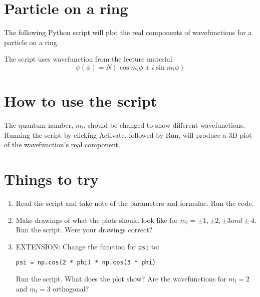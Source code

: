 \documentclass{article}
\begin{document}
\section{Particle on a ring}

The following Python script will plot the real components of wavefunctions for a particle on a ring. \par\medskip 
\noindent The script uses wavefunction from the lecture material:
\[\psi (\phi) = N(\cos m_l \phi \pm i \sin m_l \phi) \]

\section{How to use the script}
The quantum number, $m_l$, should be changed to show different wavefunctions. Running the script by clicking Activate, followed by Run, will produce a 3D plot of the wavefunction's real component.

\section{Things to try}
\begin{enumerate}
\item Read the script and take note of the parameters and formulae. Run the code.
\item Make drawings of what the plots should look like for $m_l=\pm 1, \pm 2, \pm 3 and \pm 4$. Run the script. Were your drawings correct? 
\item EXTENSION: Change the function for \texttt{psi} to: \par\texttt{psi = np.cos(2 * phi) * np.cos(3 * phi)}\par Run the script. What does the plot show? Are the wavefunctions for $m_l = 2$ and $m_l = 3$ orthogonal?
\end{enumerate}
\end{document}
